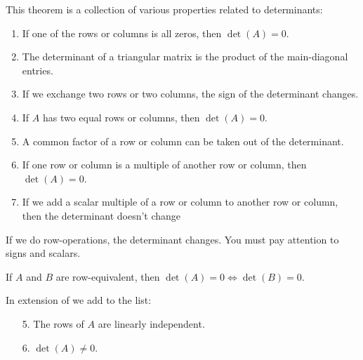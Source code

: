 \begin{thm}\label{thm-determinant-properties}
	This theorem is a collection of various properties related to determinants:
	\begin{enumerate}
		\item If one of the rows or columns is all zeros, then $\det(A)=0$.
		\item The determinant of a triangular matrix is the product of the main-diagonal entries.
		\item If we exchange two rows or two columns, the sign of the determinant changes.
		\item If $A$ has two equal rows or columns, then $\det(A)=0$.
		\item A common factor of a row or column can be taken out of the determinant.
		\item If one row or column is a multiple of another row or column, then $\det(A)=0$.
		\item If we add a scalar multiple of a row or column to another row or column, then
		      the determinant doesn't change
	\end{enumerate}
\end{thm}

\begin{rem}
	If we do row-operations, the determinant changes. You must pay attention to
	signs and scalars.
\end{rem}

\begin{thm}\label{thm-determinant-row-equivalent-zero}
	If $A$ and $B$ are row-equivalent, then $\det(A)=0 \Leftrightarrow \det(B)=0$.
\end{thm}

\begin{thm}\label{thm-square-matrix-properties-extended}
	In extension of  we add to the list:
	\begin{enumerate}
		\item[5.] The rows of $A$ are linearly independent.
		\item[6.] $\det(A)\neq0$.
	\end{enumerate}
\end{thm}

